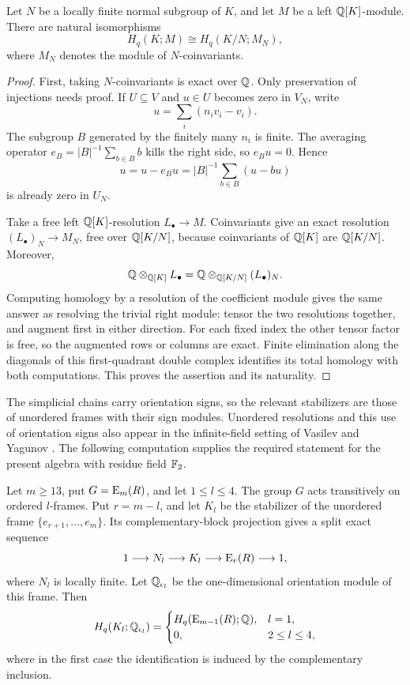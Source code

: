\begin{lemma}\label{st:coinvariants}
Let $N$ be a locally finite normal subgroup of $K$, and let $M$ be a
left $\mathbb Q[K]$-module. There are natural isomorphisms
\[
 H_q(K;M)\cong H_q(K/N;M_N),
\]
where $M_N$ denotes the module of $N$-coinvariants.
\end{lemma}

\begin{proof}
First, taking $N$-coinvariants is exact over $\mathbb Q$. Only preservation
of injections needs proof. If $U\subseteq V$ and $u\in U$ becomes
zero in $V_N$, write
\[
 u=\sum_i(n_i v_i-v_i).
\]
The subgroup $B$ generated by the finitely many $n_i$ is finite.
The averaging operator $e_B=|B|^{-1}\sum_{b\in B}b$ kills the
right side, so $e_Bu=0$. Hence
\[
 u=u-e_Bu=|B|^{-1}\sum_{b\in B}(u-bu)
\]
is already zero in $U_N$.

Take a free left $\mathbb Q[K]$-resolution $L_\bullet\to M$.
Coinvariants give an exact resolution $(L_\bullet)_N\to M_N$,
free over $\mathbb Q[K/N]$, because coinvariants of $\mathbb Q[K]$ are
$\mathbb Q[K/N]$. Moreover,
\[
 \mathbb Q\otimes_{\mathbb Q[K]}L_\bullet
 =\mathbb Q\otimes_{\mathbb Q[K/N]}(L_\bullet)_N.
\]
Computing homology by a resolution of the coefficient module gives
the same answer as resolving the trivial right module: tensor the
two resolutions together, and augment first in either direction.
For each fixed index the other tensor factor is free, so the
augmented rows or columns are exact. Finite elimination along the
diagonals of this first-quadrant double complex identifies its total
homology with both computations. This proves the assertion and its
naturality.
\end{proof}

The simplicial chains carry orientation signs, so the relevant
stabilizers are those of unordered frames with their sign modules.
Unordered resolutions and this use of orientation signs also appear
in the infinite-field setting of Vasilev and Yagunov
\cite{VasilevYagunov2025Unordered}. The following computation supplies
the required statement for the present algebra with residue field
$\mathbb F_2$.

\begin{lemma}\label{st:stabilizers}
Let $m\geq13$, put $G=\operatorname{E}_m(R)$, and let $1\leq l\leq4$.
The group $G$ acts transitively on ordered $l$-frames. Put $r=m-l$,
and let $K_l$ be the stabilizer of the unordered frame
$\{e_{r+1},\ldots,e_m\}$. Its complementary-block projection gives
a split exact sequence
\[
 1\longrightarrow N_l\longrightarrow K_l
 \longrightarrow\operatorname{E}_r(R)\longrightarrow1,
\]
where $N_l$ is locally finite. Let $\mathbb Q_{\epsilon_l}$ be the
one-dimensional orientation module of this frame. Then
\[
 H_q(K_l;\mathbb Q_{\epsilon_l})=
 \begin{cases}
 H_q(\operatorname{E}_{m-1}(R);\mathbb Q),&l=1,\\
 0,&2\leq l\leq4,
 \end{cases}
\]
where in the first case the identification is induced by the
complementary inclusion.
\end{lemma}

